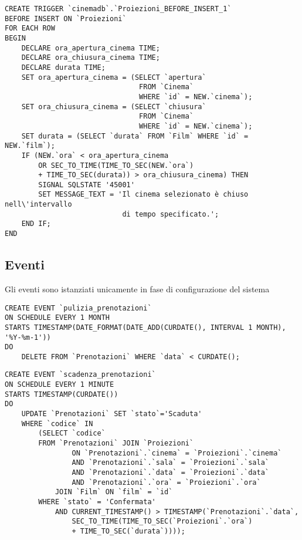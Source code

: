\pagebreak
\begin{verbatim}
CREATE TRIGGER `cinemadb`.`Proiezioni_BEFORE_INSERT_1`
BEFORE INSERT ON `Proiezioni`
FOR EACH ROW
BEGIN
    DECLARE ora_apertura_cinema TIME;
    DECLARE ora_chiusura_cinema TIME;
    DECLARE durata TIME;
    SET ora_apertura_cinema = (SELECT `apertura`
                                FROM `Cinema`
                                WHERE `id` = NEW.`cinema`);
    SET ora_chiusura_cinema = (SELECT `chiusura`
                                FROM `Cinema`
                                WHERE `id` = NEW.`cinema`);
    SET durata = (SELECT `durata` FROM `Film` WHERE `id` = NEW.`film`);
    IF (NEW.`ora` < ora_apertura_cinema
        OR SEC_TO_TIME(TIME_TO_SEC(NEW.`ora`)
        + TIME_TO_SEC(durata)) > ora_chiusura_cinema) THEN
        SIGNAL SQLSTATE '45001'
        SET MESSAGE_TEXT = 'Il cinema selezionato è chiuso nell\'intervallo
                            di tempo specificato.';
    END IF;
END
\end{verbatim}

\pagebreak
\subsection*{Eventi}
%
%

Gli eventi sono istanziati unicamente in fase di configurazione del sistema

\begin{verbatim}
CREATE EVENT `pulizia_prenotazioni`
ON SCHEDULE EVERY 1 MONTH
STARTS TIMESTAMP(DATE_FORMAT(DATE_ADD(CURDATE(), INTERVAL 1 MONTH), '%Y-%m-1'))
DO
    DELETE FROM `Prenotazioni` WHERE `data` < CURDATE();
\end{verbatim}

\begin{verbatim}
CREATE EVENT `scadenza_prenotazioni`
ON SCHEDULE EVERY 1 MINUTE
STARTS TIMESTAMP(CURDATE())
DO
    UPDATE `Prenotazioni` SET `stato`='Scaduta'
    WHERE `codice` IN
        (SELECT `codice`
        FROM `Prenotazioni` JOIN `Proiezioni`
                ON `Prenotazioni`.`cinema` = `Proiezioni`.`cinema`
                AND `Prenotazioni`.`sala` = `Proiezioni`.`sala`
                AND `Prenotazioni`.`data` = `Proiezioni`.`data`
                AND `Prenotazioni`.`ora` = `Proiezioni`.`ora`
            JOIN `Film` ON `film` = `id`
        WHERE `stato` = 'Confermata'
            AND CURRENT_TIMESTAMP() > TIMESTAMP(`Prenotazioni`.`data`,
                SEC_TO_TIME(TIME_TO_SEC(`Proiezioni`.`ora`)
                + TIME_TO_SEC(`durata`))));
\end{verbatim}



